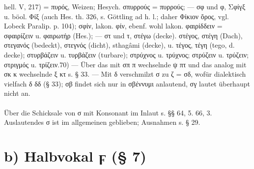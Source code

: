 hell. V, 217) = πυρός, Weizen; Hesych. σπυρρούς = πυρρούς; — σφ und φ, Σφίγξ u.
böol. Φίξ (auch Hes. th. 326, s. Göttling ad h. l.; daher Φίκιον ὄρος, vgl.
Lobeck Paralip. p. 104); σφίν, lakon. φίν, ebenf. wohl lakon. φαιρίδδειν =
σφαιρίζειν u. φαιρωτήρ (Hes.); — στ und τ, στέγω (decke). στέγος, στέγη (Dach),
στεγανός (bedeckt), στεγνός (dicht),  sthagâmi (decke), u. τέγος, τέγη (tego,
d. decke); στυρβάζειν u. τυρβάζειν (turbare); στρύχνος u. τρύχνος; στρύζειν u.
τρύζειν; στριγμός u. τρίζειν.70) — Über das mit σπ π wechselnde ψ πτ und das
analog mit σκ κ wechselnde ξ κτ s. § 33. — Mit δ verschmilzt σ zu ζ = σδ, wofür
dialektisch vielfach δ δδ (§ 33); σβ findet sich nur in σβέννυμι anlautend, σγ
lautet überhaupt nicht an. 

\paragraph{} Über die Schicksale von σ mit Konsonant im Inlaut s. §§ 64, 5. 66,
3. Auslautendes σ ist im allgemeinen geblieben; Ausnahmen s. § 29.

\section{b) Halbvokal ϝ (§ 7)}

